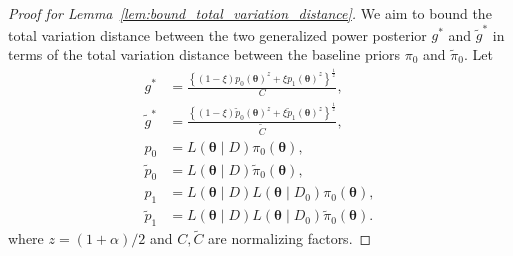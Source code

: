 \documentclass[10pt,a4paper]{amsart}
\begin{document}
\begin{proof}[Proof for Lemma~\ref{lem:bound_total_variation_distance}]
    We aim to bound the total variation distance between the two generalized power posterior $g^*$ and $\tilde{g}^*$ in terms of the total variation distance between the baseline priors $\pi_0$ and $\tilde{\pi}_0$.
    Let 
    \begin{align*}
        g^* &= \frac{\left\{(1 - \xi)p_0(\bm{\theta})^z + \xi p_1(\bm{\theta})^z\right\}^{\frac{1}{z}}}{C}, \\
        \tilde{g}^* &= \frac{\left\{(1 - \xi)\tilde{p}_0(\bm{\theta})^z + \xi \tilde{p}_1(\bm{\theta})^z\right\}^{\frac{1}{z}}}{\tilde{C}}, \\
        p_0 &= L(\bm{\theta} \mid D) \pi_0(\bm{\theta}), \\
        \tilde{p}_0 &= L(\bm{\theta} \mid D) \tilde{\pi}_0(\bm{\theta}), \\
        p_1 &= L(\bm{\theta} \mid D) L(\bm{\theta} \mid D_0) \pi_0(\bm{\theta}), \\
        \tilde{p}_1 &= L(\bm{\theta} \mid D) L(\bm{\theta} \mid D_0) \tilde{\pi}_0(\bm{\theta}).
    \end{align*}
    where $z = (1 + \alpha) / 2$ and $C, \tilde{C}$ are normalizing factors.


\end{proof}
\end{document}
